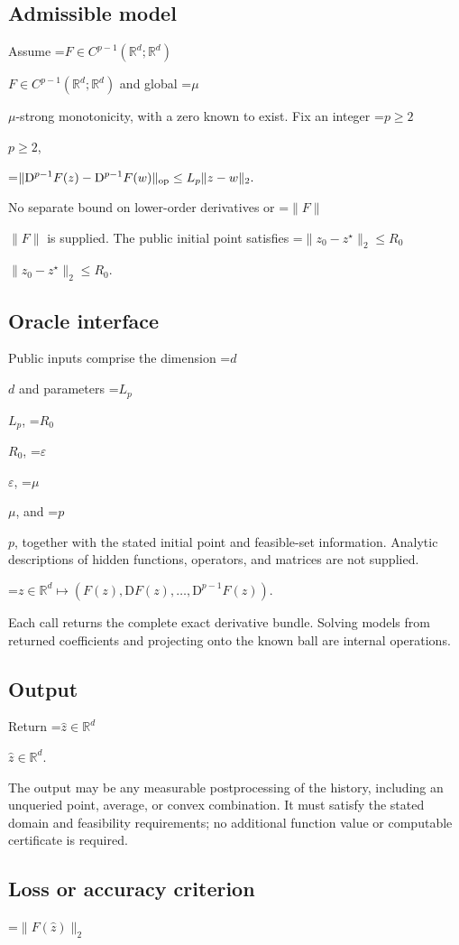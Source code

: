 \documentclass[10pt,a4paper]{article}
\newcommand{\AtlasMath}[1]{\par\begingroup\centering\setbox0=\hbox{$\displaystyle #1$}\ifdim\wd0>1.4\linewidth\typeout{ATLAS WIDE FORMULA: \the\wd0}\fi\ifdim\wd0>\linewidth\resizebox{\linewidth}{!}{\box0}\else\box0\fi\par\endgroup}
\newcommand{\AtlasInlineMath}[1]{\begingroup\setbox0=\hbox{$#1$}\ifdim\wd0>.4\linewidth\endgroup\AtlasMath{#1}\else\endgroup$#1$\fi}
\begin{document}
\subsection{Admissible model}
Assume \AtlasInlineMath{F\in C^{p-1}(\mathbb{R}^d;\mathbb{R}^d)} and global \AtlasInlineMath{\mu}-strong monotonicity, with a zero known to exist. Fix an integer \AtlasInlineMath{p\ge2},


\AtlasMath{\|\mathrm{D}^{p-1}F(z)-\mathrm{D}^{p-1}F(w)\|_{\rm op}\le L_p\|z-w\|_2.}


No separate bound on lower-order derivatives or \AtlasInlineMath{\|F\|} is supplied. The public initial point satisfies \AtlasInlineMath{\|z_0-z^\star\|_2\le R_0}.

\subsection{Oracle interface}
Public inputs comprise the dimension \AtlasInlineMath{d} and parameters \AtlasInlineMath{L_p}, \AtlasInlineMath{R_0}, \AtlasInlineMath{\varepsilon}, \AtlasInlineMath{\mu}, and \AtlasInlineMath{p}, together with the stated initial point and feasible-set information. Analytic descriptions of hidden functions, operators, and matrices are not supplied.


\AtlasMath{z\in\mathbb{R}^d\longmapsto(F(z),\mathrm{D}F(z),\ldots,\mathrm{D}^{p-1}F(z)).}


Each call returns the complete exact derivative bundle. Solving models from returned coefficients and projecting onto the known ball are internal operations.

\subsection{Output}
Return \AtlasInlineMath{\widehat{z}\in\mathbb{R}^d}.

The output may be any measurable postprocessing of the history, including an unqueried point, average, or convex combination. It must satisfy the stated domain and feasibility requirements; no additional function value or computable certificate is required.

\subsection{Loss or accuracy criterion}

\AtlasMath{\|F(\widehat{z})\|_2}
\end{document}
